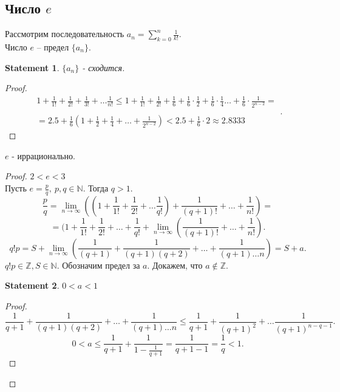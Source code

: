 \documentclass[11pt]{book}
\newcommand{\Z}{\mathbb{Z}}
\newcommand{\N}{\mathbb{N}}
\newcommand{\slim}{\sum\limits}
\renewcommand{\le}{\leqslant}
\theoremstyle{definition}
\theoremstyle{plain}
\theoremstyle{plain}
\newtheorem*{st}{Statement}
\theoremstyle{definition}
\theoremstyle{remark}
\begin{document}
\subsection{Число $e$}\label{ques_28}
\begin{defn}
    Рассмотрим последовательность $a_n = \slim_{k=0}^n \frac{1}{k!}$.\\
    Число $e$ -- предел $\{a_n\}$. 
\end{defn}
\begin{st}
    $\{a_n\}$ - сходится.
\end{st}
\begin{proof}
    \[
	\begin{array}{c}
	1 + \frac{1}{1!} + \frac{1}{2!} + \frac{1}{3!} + \ldots \frac{1}{n!} \le 1 + \frac{1}{1!} +\frac{1}{2!} + \frac{1}{6} + \frac{1}{6}\cdot \frac{1}{2} + \frac{1}{6}\cdot \frac{1}{4} \ldots + \frac{1}{6} \cdot \frac{1}{2^{n-2}} = \\ \\
	= 2.5 +\frac{1}{6} (1 + \frac{1}{2} + \frac{1}{4} + \ldots +\frac{1}{2^{n-2}}) < 2.5 + \frac{1}{6} \cdot 2 \approx 2.8333
	\end{array}
    .\] 
\end{proof}
\begin{thm}
    $e$ - иррационально.
\end{thm}
\begin{proof}
    $2 < e < 3$ \\
    Пусть $e = \frac{p}{q}, ~p, q \in \N$. Тогда $q > 1$.
    \[
	\frac{p}{q} = \lim\limits_{n \to \infty} \left ( (1 + \frac{1}{1!} + \frac{1}{2!} + \ldots \frac{1}{q!}) + \frac{1}{(q+1)!} + \ldots +\frac{1}{n!} \right) = 
    \] 
    \[
	= (1 + \frac{1}{1!} + \frac{1}{2!} + \ldots  + \frac{1}{q!} + \lim\limits_{n \to \infty} \left ( \frac{1}{(q+1)!} + \ldots + \frac{1}{n!} \right)
    .\] 
    \[
	q! p = S + \lim\limits_{n \to \infty} \left ( \frac{1}{(q+1)} + \frac{1}{(q+1)(q+2)} +\ldots + \frac{1}{(q+1) \ldots n} \right) = S + a
    .\] 
    $q! p \in \Z, S \in \N$. Обозначим предел за $a$.
    Докажем, что $a \notin \Z$. 
    \begin{st}
	$0 < a < 1$
    \end{st}
    \begin{proof}
        \[
	    \frac{1}{q+1} + \frac{1}{(q+1)(q+2)} + \ldots + \frac{1}{(q+1) \ldots  n} \le \frac{1}{q+1} + \frac{1}{(q+1)^2} + \ldots \frac{1}{(q+1)^{n-q-1}}
        .\] 
	\[
	0<a \le \frac{1}{q+1} + \frac{1}{1- \frac{1}{q+1}} = \frac{1}{q+1-1} = \frac{1}{q} <1
	.\] 
    \end{proof}
\end{proof}
\end{document}
